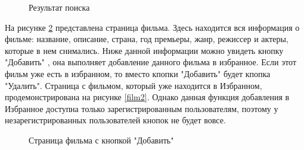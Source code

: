 \documentclass[a4paper, 14pt]{article}
\begin{document}
	\newpage
	\begin{figure}[h!]
		\caption{Результат поиска}
		\label{res}
	\end{figure}
	
	На рисунке \ref{film} представлена страница фильма. Здесь находится вся информация о фильме: название, описание, страна, год премьеры, жанр, режиссер и актеры, которые в нем снимались. Ниже данной информации можно увидеть кнопку "Добавить" , она выполняет добавление данного фильма в избранное. Если этот фильм уже есть в избранном, то вместо кпопки "Добавить" будет кпопка "Удалить". Страница с фильмом, который уже находится в Избранном, продемонстрирована на рисунке \ref{film2}. Однако данная функция добавления в Избранное доступна только зарегистрированным пользователям, поэтому у незарегистрированных пользователей кнопок не будет вовсе.		
	
	\begin{figure}[h!]
		\caption{Страница фильма с кнопкой "Добавить"}
		\label{film}
	\end{figure}
\end{document}
